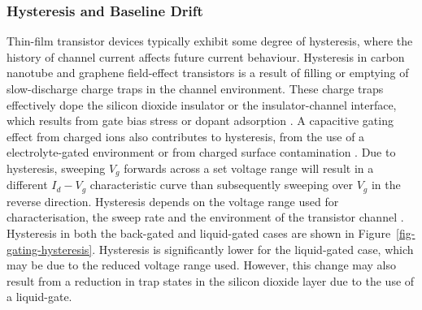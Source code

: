\documentclass[
  a4paper,
]{scrbook}
\begin{document}
\hypertarget{hysteresis-and-baseline-drift}{%
\subsubsection*{Hysteresis and Baseline
Drift}\label{hysteresis-and-baseline-drift}}

Thin-film transistor devices typically exhibit some degree of
hysteresis, where the history of channel current affects future current
behaviour. Hysteresis in carbon nanotube and graphene field-effect
transistors is a result of filling or emptying of slow-discharge charge
traps in the channel environment. These charge traps effectively dope
the silicon dioxide insulator or the insulator-channel interface, which
results from gate bias stress or dopant adsorption
\autocite{McEuen2002,Kim2003,Wang2010,Bartolomeo2011,Bargaoui2018,Peng2018}.
A capacitive gating effect from charged ions also contributes to
hysteresis, from the use of a electrolyte-gated environment or from
charged surface contamination \autocite{Wang2010,Yao2021}. Due to
hysteresis, sweeping \(V_g\) forwards across a set voltage range will
result in a different \(I_d - V_g\) characteristic curve than
subsequently sweeping over \(V_g\) in the reverse direction. Hysteresis
depends on the voltage range used for characterisation, the sweep rate
and the environment of the transistor channel
\autocite{Kim2003,Wang2010}. Hysteresis in both the back-gated and
liquid-gated cases are shown in Figure~\ref{fig-gating-hysteresis}.
Hysteresis is significantly lower for the liquid-gated case, which may
be due to the reduced voltage range used. However, this change may also
result from a reduction in trap states in the silicon dioxide layer due
to the use of a liquid-gate.
\end{document}
